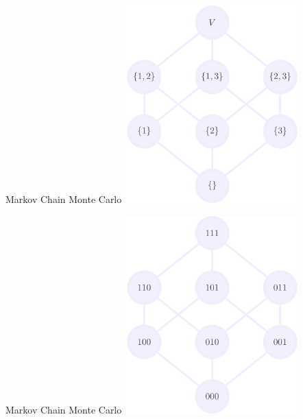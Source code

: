 \documentclass[mathserif]{beamer}
\begin{document}
\begin{frame}{Markov Chain Monte Carlo}
\vspace{0.5em}
\centering
\includegraphics[height=3in]{figures/lattice_full.pdf}
\end{frame}

\begin{frame}{Markov Chain Monte Carlo}
\vspace{0.5em}
\centering
\includegraphics[height=3in]{figures/lattice_full_binary.pdf}
\end{frame}
\end{document}
